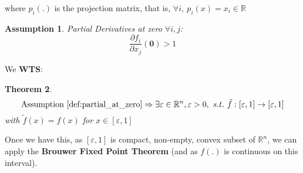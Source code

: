 \documentclass[12pt]{article}
\newtheorem{theorem}{Theorem}
\newtheorem{assumption}[theorem]{Assumption}
\begin{document}
where $p_i(.)$ is the projection matrix, that is, $\forall i, \ p_i(x)=x_i \in \mathbb{R}$

\bigskip

\begin{assumption}{Partial Derivatives at zero} $\forall i,j$:
\[  \frac{\partial f_i}{\partial x_j}(\bm{0}) >1  \]
    \label{def:partial_at_zero}
\end{assumption}

We \textbf{WTS}:

\begin{theorem}
\[ \text{Assumption } \ref{def:partial_at_zero} \Rightarrow \exists \varepsilon \in \mathbb{R}^n, \varepsilon >0, \  s.t. \ \tilde{f}: [\varepsilon ,1] \rightarrow [\varepsilon ,1] \]
with $\tilde{f}(x) = f(x)$ for $x \in [\varepsilon ,1]$
\end{theorem}

Once we have this, as $[\varepsilon ,1]$ is compact, non-empty, convex subset of $\mathbb{R}^n$, we can apply the \textbf{Brouwer Fixed Point Theorem} (and as $f(.)$ is continuous on this interval).
\end{document}
